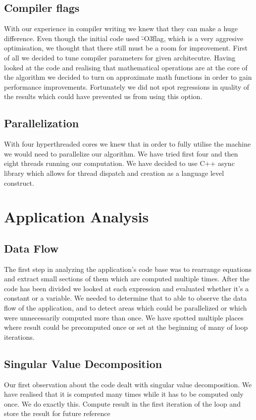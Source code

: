 \documentclass[conference]{IEEEtran}
\begin{document}
\subsection{Compiler flags}
With our experience in compiler writing we knew that they can make a huge difference. Even though the initial code used \"-O3\" flag, which is a very aggresive optimisation, we thought that there still must be a room for improvement. First of all we decided to tune compiler parameters for given architecutre. Having looked at the code and realising that mathematical operations are at the core of the algorithm we decided to turn on approximate math functions in order to gain performance improvements. Fortunately we did not spot regressions in quality of the results which could have prevented us from using this option.

\subsection{Parallelization}
With four hyperthreaded cores we knew that in order to fully utilise the machine we would need to parallelize our algorithm. We have tried first four and then eight threads running our computation. We have decided to use C++ async library which allows for thread dispatch and creation as a language level construct.

\section{Application Analysis}
 
\subsection{Data Flow}
The first step in analyzing the application's code base was to rearrange equations and extract small sections of them which are computed multiple times. After the code has been divided we looked at each expression and evaluated whether it's a constant or a variable. We needed to determine that to able to observe the data flow of the application, and to detect areas which could be parallelized or which were unnecessarily computed more than once. We have spotted multiple places where result could be precomputed once or set at the beginning of many of loop iterations.

\subsection{Singular Value Decomposition}
Our first observation about the code dealt with singular value decomposition. We have realised that it is computed many times while it has to be computed only once. We do exactly this. Compute result in the first iteration of the loop and store the result for future reference
\end{document}
